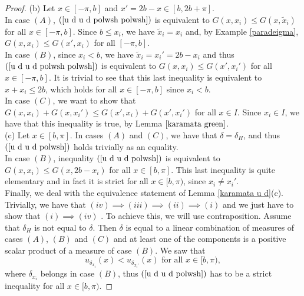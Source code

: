 \documentclass[11pt]{amsart}
\numberwithin{equation}{section}
\begin{document}
\begin{proof}
(b) Let \(x\in[-\pi,b]\) and \(x'=2b-x\in[b,2b+\pi].\)\\
In case \((A)\), \((\ref{u d u d polwsh polwsh})\) is equivalent to \(G(x,x_i)\leq G(x,\tilde{x}_i)\) for all \(x\in[-\pi,b]\). Since \(b\leq x_i\), we have \(\tilde{x}_i=x_i\) and, by Example \ref{paradeigma}, \(G(x,x_i)\leq G(x',x_i)\) for all \([-\pi,b].\)\\
In case \((B)\), since \(x_i<b\), we have \(\tilde{x}_i=x_i'=2b-x_i\) and thus \((\ref{u d u d polwsh polwsh})\) is equivalent to \(G(x,x_i)\leq G(x',x_i')\) for all \(x\in[-\pi,b]\). It is trivial to see that this last inequality is equivalent to \(x+x_i\leq 2b\), which holds for all \(x\in[-\pi,b]\) since \(x_i<b\).\\
In case \((C)\), we want to show that \(G(x,x_i)+G(x,x_i')\leq G(x',x_i)+G(x',x_i')\) for all \(x\in I\). Since \(x_i\in I\), we have that this inequality is true, by Lemma \(\ref{karamata green}\).\\
(c) Let \(x\in[b,\pi]\). In cases \((A)\) and \((C)\), we have that \(\delta=\delta_H\), and thus \((\ref{u d u d polwsh})\) holds trivially as an equality.\\
In case \((B)\), inequality \((\ref{u d u d polwsh})\) is equivalent to \(G(x,x_i)\leq G(x,2b-x_i)\) for all \(x\in[b,\pi]\). This last inequality is quite elementary and in fact it is strict for all \(x\in[b,\pi)\), since \(x_i\neq x_i'\).\\
Finally, we deal with the equivalence statement of Lemma \ref{karamata u d}(c). Trivially, we have that \((iv)\implies(iii)\implies(ii)\implies(i)\) and we just have to show that \((i)\implies(iv)\) . To achieve this, we will use contraposition. Assume that \(\delta_H\) is not equal to \(\delta\). Then \(\delta\) is equal to a linear combination of measures of cases \((A)\), \((B)\) and \((C)\) and at least one of the components is a positive scalar product of a measure of case \((B)\). We saw that
\[u_{\delta_{x_i}}(x)<u_{\delta_{x_i'}}(x)\text{ for all }x\in[b,\pi),\]
where \(\delta_{x_i}\) belongs in case \((B)\), thus \((\ref{u d u d polwsh})\) has to be a strict inequality for all \(x\in[b,\pi)\).
\end{proof}
\end{document}
